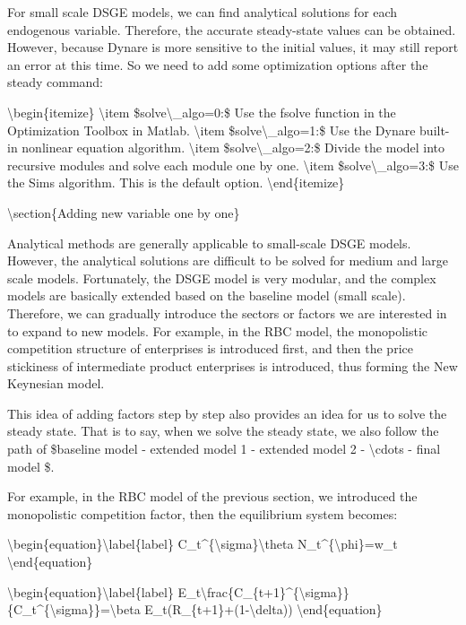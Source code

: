 \documentclass[10pt,math=newtx,citestyle=gb7714-2015,bibstyle=gb7714-2015]{elegantbook}
\begin{document}
	For small scale DSGE models, we can find analytical solutions for each endogenous variable. Therefore, the accurate steady-state values can be obtained. However, because Dynare is more sensitive to the initial values, it may still report an error at this time. So we need to add some optimization options after the steady command:
	
	\textbackslash{}begin\{itemize\}
	\textbackslash{}item \$solve\textbackslash{}\_algo=0:\$ Use the fsolve function in the Optimization Toolbox in Matlab.
	\textbackslash{}item \$solve\textbackslash{}\_algo=1:\$ Use the Dynare built-in nonlinear equation algorithm.
	\textbackslash{}item \$solve\textbackslash{}\_algo=2:\$ Divide the model into recursive modules and solve each module one by one.
	\textbackslash{}item \$solve\textbackslash{}\_algo=3:\$ Use the Sims algorithm. This is the default option.
	\textbackslash{}end\{itemize\}
	
	\textbackslash{}section\{Adding new variable one by one\}
	
	Analytical methods are generally applicable to small-scale DSGE models.  However, the analytical solutions are difficult to be solved for medium and large scale models. Fortunately, the DSGE model is very modular, and the complex models are basically extended based on the baseline model (small scale). Therefore, we can gradually introduce the sectors or factors we are interested in to expand to new models. For example, in the RBC model, the monopolistic competition structure of enterprises is introduced first, and then the price stickiness of intermediate product enterprises is introduced, thus forming the New Keynesian model.
	
	This idea of adding factors step by step also provides an idea for us to solve the steady state. That is to say, when we solve the steady state, we also follow the path of \$baseline model - extended model 1 - extended model 2 - \textbackslash{}cdots - final model \$.
	
	For example, in the RBC model of the previous section, we introduced the monopolistic competition factor, then the equilibrium system becomes:
	
	\textbackslash{}begin\{equation\}\textbackslash{}label\{label\}
	C\_t\^{}\{\textbackslash{}sigma\}\textbackslash{}theta N\_t\^{}\{\textbackslash{}phi\}=w\_t
	\textbackslash{}end\{equation\}
	
	\textbackslash{}begin\{equation\}\textbackslash{}label\{label\}
	E\_t\textbackslash{}frac\{C\_\{t+1\}\^{}\{\textbackslash{}sigma\}\}\{C\_t\^{}\{\textbackslash{}sigma\}\}=\textbackslash{}beta E\_t(R\_\{t+1\}+(1-\textbackslash{}delta))
	\textbackslash{}end\{equation\}
	
\end{document}
